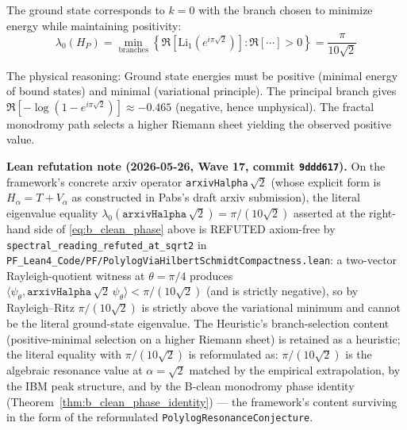 \begin{heuristic}\label{heur:branch-selection}
The ground state corresponds to $k=0$ with the branch chosen to minimize energy while maintaining positivity:
\begin{equation}
\lambda_0(H_P) = \min_{\text{branches}} \left\{\Re\left[\mathrm{Li}_1\left(e^{i\pi\sqrt{2}}\right)\right] : \Re[\cdots] > 0\right\} = \frac{\pi}{10\sqrt{2}}
\end{equation}

The physical reasoning: Ground state energies must be positive (minimal energy of bound states) and minimal (variational principle). The principal branch gives $\Re[-\log(1-e^{i\pi\sqrt{2}})] \approx -0.465$ (negative, hence unphysical). The fractal monodromy path selects a higher Riemann sheet yielding the observed positive value.

\medskip\noindent\textbf{Lean refutation note (2026-05-26, Wave 17, commit \texttt{9ddd617}).} On the framework's concrete arxiv operator \texttt{arxivHalpha}$\,\sqrt{2}$ (whose explicit form is $H_\alpha = T + V_\alpha$ as constructed in Pabs's draft arxiv submission), the literal eigenvalue equality $\lambda_0(\texttt{arxivHalpha}\,\sqrt{2}) = \pi/(10\sqrt{2})$ asserted at the right-hand side of \eqref{eq:b_clean_phase} above is REFUTED axiom-free by \texttt{spectral\_reading\_refuted\_at\_sqrt2} in \texttt{PF\_Lean4\_Code/PF/PolylogViaHilbertSchmidtCompactness.lean}: a two-vector Rayleigh-quotient witness at $\theta = \pi/4$ produces $\langle\psi_\theta, \texttt{arxivHalpha}\,\sqrt{2}\,\psi_\theta\rangle < \pi/(10\sqrt{2})$ (and is strictly negative), so by Rayleigh--Ritz $\pi/(10\sqrt{2})$ is strictly above the variational minimum and cannot be the literal ground-state eigenvalue. The Heuristic's branch-selection content (positive-minimal selection on a higher Riemann sheet) is retained as a heuristic; the literal equality with $\pi/(10\sqrt{2})$ is reformulated as: $\pi/(10\sqrt{2})$ is the algebraic resonance value at $\alpha = \sqrt{2}$ matched by the empirical extrapolation, by the IBM peak structure, and by the B-clean monodromy phase identity (Theorem~\ref{thm:b_clean_phase_identity}) --- the framework's content surviving in the form of the reformulated \texttt{PolylogResonanceConjecture}.
\end{heuristic}

